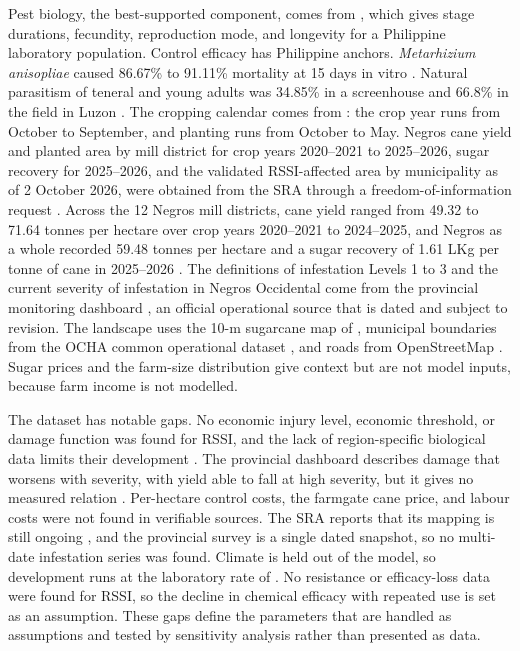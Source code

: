 Pest biology, the best-supported component, comes from \citet{Guerrero2026}, which gives stage durations, fecundity, reproduction mode, and longevity for a Philippine laboratory population. Control efficacy has Philippine anchors. \emph{Metarhizium anisopliae} caused 86.67\% to 91.11\% mortality at 15 days in vitro \citep{Buletin2026}. Natural parasitism of teneral and young adults was 34.85\% in a screenhouse and 66.8\% in the field in Luzon \citep{Guerrero2024}. The cropping calendar comes from \citet{MojicaSevilla2025}: the crop year runs from October to September, and planting runs from October to May. Negros cane yield and planted area by mill district for crop years 2020--2021 to 2025--2026, sugar recovery for 2025--2026, and the validated RSSI-affected area by municipality as of 2 October 2026, were obtained from the SRA through a freedom-of-\allowbreak information request \citep{SRA2026FOI}. Across the 12 Negros mill districts, cane yield ranged from 49.32 to 71.64 tonnes per hectare over crop years 2020--2021 to 2024--2025, and Negros as a whole recorded 59.48 tonnes per hectare and a sugar recovery of 1.61 LKg per tonne of cane in 2025--2026 \citep{SRA2026FOI}. The definitions of infestation Levels 1 to 3 and the current severity of infestation in Negros Occidental come from the provincial monitoring dashboard \citep{PGNO2026}, an official operational source that is dated and subject to revision. The landscape uses the 10-m sugarcane map of \citet{DiTommaso2024}, municipal boundaries from the OCHA common operational dataset \citep{OCHA2025}, and roads from OpenStreetMap \citep{OSM2026}. Sugar prices and the farm-size distribution give context but are not model inputs, because farm income is not modelled.

The dataset has notable gaps. No economic injury level, economic threshold, or damage function was found for RSSI, and the lack of region-specific biological data limits their development \citep{Guerrero2026}. The provincial dashboard describes damage that worsens with severity, with yield able to fall at high severity, but it gives no measured relation \citep{PGNO2026}. Per-hectare control costs, the farmgate cane price, and labour costs were not found in verifiable sources. The SRA reports that its mapping is still ongoing \citep{SRA2026FOI}, and the provincial survey is a single dated snapshot, so no multi-date infestation series was found. Climate is held out of the model, so development runs at the laboratory rate of \citet{Guerrero2026}. No resistance or efficacy-loss data were found for RSSI, so the decline in chemical efficacy with repeated use is set as an assumption. These gaps define the parameters that are handled as assumptions and tested by sensitivity analysis rather than presented as data.
